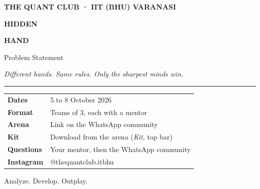 \documentclass[11pt,a4paper]{article}
\begin{document}
\begin{titlepage}
\thispagestyle{empty}
\vspace*{3cm}
{\sffamily\small\color{mint}\textbf{THE QUANT CLUB · IIT (BHU) VARANASI}}\par
\vspace{1.2cm}
{\sffamily\fontsize{46}{50}\selectfont\bfseries HIDDEN\par}
{\sffamily\fontsize{46}{50}\selectfont\bfseries\color{mint} HAND\par}
\vspace{0.8cm}
{\sffamily\Large Problem Statement\par}
\vspace{0.4cm}
{\large\itshape\color{quiet} Different hands. Same rules. Only the sharpest minds win.\par}
\vspace{2cm}
{\color{rule}\rule{\linewidth}{0.6pt}}\par
\vspace{0.4cm}
\begin{tabularx}{\linewidth}{@{}lL@{}}
\textbf{Dates}  & 5 to 8 October 2026 \\
\textbf{Format} & Teams of 3, each with a mentor \\
\textbf{Arena}  & Link on the WhatsApp community \\
\textbf{Kit}    & Download from the arena (\emph{Kit}, top bar) \\
\textbf{Questions} & Your mentor, then the WhatsApp community \\
\textbf{Instagram} & @thequantclub.itbhu \\
\end{tabularx}
\vfill
{\sffamily\small\color{quiet} Analyze. Develop. Outplay.}
\end{titlepage}

\tableofcontents
\newpage

\let\oldsubsection\subsection
\let\subsection\section
\let\subsubsection\oldsubsection
\end{document}
